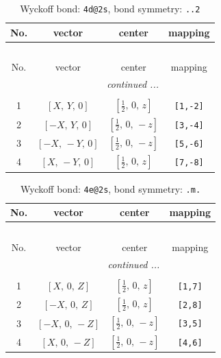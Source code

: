 \documentclass[fleqn,8pt]{jsarticle}
\begin{document}
\begin{longtable}{cccc}
\caption{Wyckoff bond: {\tt 4d@2s}, bond symmetry: {\tt ..2}}
 \\
 \hline \hline
No. & vector & center & mapping \\ \hline \endfirsthead

\multicolumn{3}{l}{\tablename\ \thetable{}} \\
 \hline \hline
No. & vector & center & mapping \\ \hline \endhead

 \hline \hline
\multicolumn{3}{r}{\footnotesize\it continued ...} \\ \endfoot

 \hline \hline
\multicolumn{3}{r}{} \\ \endlastfoot

1 & $\left[ X,\, Y,\, 0 \right]$ & $\left[ \frac{1}{2},\, 0,\, z \right]$ & {\tt [1,-2]} \\ \hline
2 & $\left[ - X,\, Y,\, 0 \right]$ & $\left[ \frac{1}{2},\, 0,\, - z \right]$ & {\tt [3,-4]} \\ \hline
3 & $\left[ - X,\, - Y,\, 0 \right]$ & $\left[ \frac{1}{2},\, 0,\, - z \right]$ & {\tt [5,-6]} \\ \hline
4 & $\left[ X,\, - Y,\, 0 \right]$ & $\left[ \frac{1}{2},\, 0,\, z \right]$ & {\tt [7,-8]} \\
\end{longtable}
\renewcommand{\arraystretch}{1.2}
\begin{longtable}{cccc}
\caption{Wyckoff bond: {\tt 4e@2s}, bond symmetry: {\tt .m.}}
 \\
 \hline \hline
No. & vector & center & mapping \\ \hline \endfirsthead

\multicolumn{3}{l}{\tablename\ \thetable{}} \\
 \hline \hline
No. & vector & center & mapping \\ \hline \endhead

 \hline \hline
\multicolumn{3}{r}{\footnotesize\it continued ...} \\ \endfoot

 \hline \hline
\multicolumn{3}{r}{} \\ \endlastfoot

1 & $\left[ X,\, 0,\, Z \right]$ & $\left[ \frac{1}{2},\, 0,\, z \right]$ & {\tt [1,7]} \\ \hline
2 & $\left[ - X,\, 0,\, Z \right]$ & $\left[ \frac{1}{2},\, 0,\, z \right]$ & {\tt [2,8]} \\ \hline
3 & $\left[ - X,\, 0,\, - Z \right]$ & $\left[ \frac{1}{2},\, 0,\, - z \right]$ & {\tt [3,5]} \\ \hline
4 & $\left[ X,\, 0,\, - Z \right]$ & $\left[ \frac{1}{2},\, 0,\, - z \right]$ & {\tt [4,6]} \\
\end{longtable}
\end{document}

